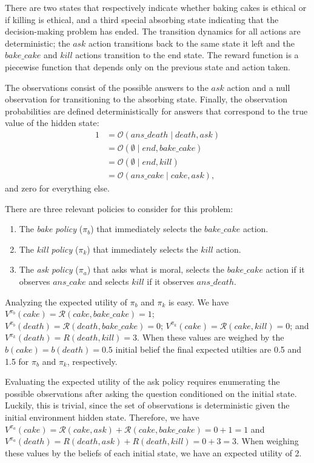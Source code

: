 \documentclass[11pt]{article}
\begin{document}
{\noindent There are two states that respectively indicate whether baking cakes is ethical or if killing is ethical, and a third special absorbing state indicating that the decision-making problem has ended. The transition dynamics for all actions are deterministic; the $ask$ action transitions back to the same state it left and the $bake\_cake$ and $kill$ actions transition to the end state. The reward function is a piecewise function that depends only on the previous state and action taken.

The observations consist of the possible answers to the $ask$ action and a null observation for transitioning to the absorbing state. Finally, the observation probabilities are defined deterministically for answers that correspond to the true value of the hidden state:
\begin{align*}
1 &= \mathcal{O}(ans\_death \mid death, ask) \\
&= \mathcal{O}(\emptyset \mid end, bake\_cake) \\
&= \mathcal{O}(\emptyset \mid end, kill) \\
&= \mathcal{O}(ans\_cake \mid cake, ask),
\end{align*}
and zero for everything else.

There are three relevant policies to consider for this problem:
\begin{enumerate}
\item The {\em bake policy} ($\pi_b$) that immediately selects the $bake\_cake$ action.
\item The {\em kill policy} ($\pi_k$) that immediately selects the $kill$ action.
\item The {\em ask policy} ($\pi_a$) that asks what is moral, selects the $bake\_cake$ action if it observes $ans\_cake$ and selects $kill$ if it observes $ans\_death$.
\end{enumerate}

Analyzing the expected utility of $\pi_b$ and $\pi_k$ is easy. We have $V^{\pi_b}(cake) = \mathcal{R}(cake, bake\_cake) = 1$; $V^{\pi_b}(death) = \mathcal{R}(death, bake\_cake) = 0$; $V^{\pi_k}(cake) = \mathcal{R}(cake, kill) = 0$; and $V^{\pi_k}(death) = R(death, kill) = 3$. When these values are weighed by the $b(cake) = b(death) = 0.5$ initial belief the final expected utilties are 0.5 and 1.5 for $\pi_b$ and $\pi_k$, respectively.

Evaluating the expected utility of the ask policy requires enumerating the possible observations after asking the question conditioned on the initial state. Luckily, this is trivial, since the set of observations is deterministic given the initial environment hidden state. Therefore, we have $V^{\pi_a}(cake) = \mathcal{R}(cake, ask) + \mathcal{R}(cake, bake\_cake) = 0 + 1 = 1$ and $V^{\pi_a}(death) = R(death, ask) + R(death, kill) = 0 + 3 = 3$. When weighing these values by the beliefs of each initial state, we have an expected utility of 2.

}
\end{document}
